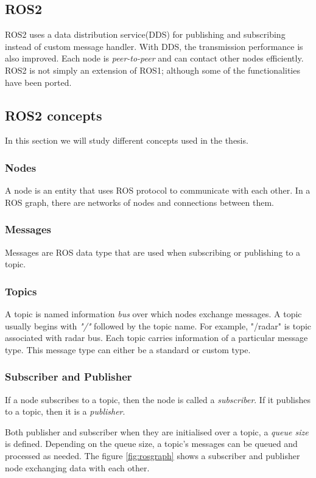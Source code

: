 \subsection{ROS2}
ROS2 uses a data distribution service(DDS) for publishing and subscribing instead of
custom message handler. With DDS, the transmission performance is also improved. Each node
is \textit{peer-to-peer} and can contact other nodes efficiently.
ROS2 is not simply an extension of ROS1; although some of the functionalities have been
ported.


\subsection{ROS2 concepts}
In this section we will study different concepts used in the thesis.
\subsubsection*{Nodes}
A node is an entity that uses ROS protocol to communicate with each other. In a ROS graph,
there are networks of nodes and connections between them.
\subsubsection*{Messages}
Messages are ROS data type that are used when subscribing or publishing to a topic.
\subsubsection*{Topics}
A topic is named information \textit{bus} over which nodes exchange messages.
A topic usually begins with \textit{"/"} followed by the topic name. For example, "/radar"
is topic associated with radar bus. Each topic carries information of a particular message
type. This message type can either be a standard or custom type.
\subsubsection*{Subscriber and Publisher}
If a node subscribes to a topic, then the node is called a \textit{subscriber}. If it
publishes to a topic, then it is a \textit{publisher}.

Both publisher and subscriber when they are initialised over a topic, a \textit{queue
size} is defined. Depending on the queue size, a topic's messages can be queued and
processed as needed. The figure \ref{fig:rosgraph} shows a subscriber and publisher node
exchanging data with each other.

